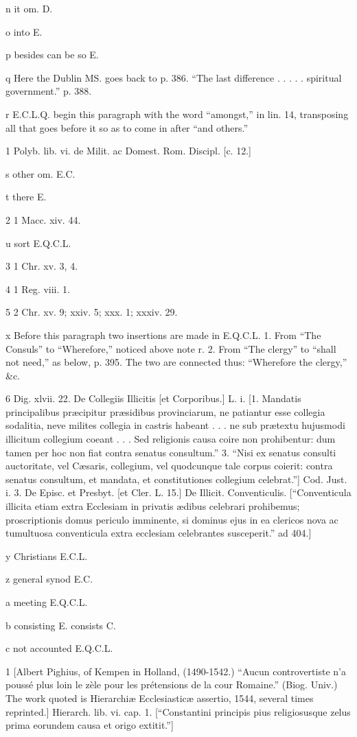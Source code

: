n
it om. D.

o
into E.

p
besides can be so E.

q
Here the Dublin MS. goes back to p. 386. “The last difference . . . . . spiritual government.” p. 388.

r
E.C.L.Q. begin this paragraph with the word “amongst,” in lin. 14, transposing all that goes before it so as to come in after “and others.”

1
Polyb. lib. vi. de Milit. ac Domest. Rom. Discipl. [c. 12.]

s
other om. E.C.

t
there E.

2
1 Macc. xiv. 44.

u
sort E.Q.C.L.

3
1 Chr. xv. 3, 4.

4
1 Reg. viii. 1.

5
2 Chr. xv. 9; xxiv. 5; xxx. 1; xxxiv. 29.

x
Before this paragraph two insertions are made in E.Q.C.L. 1. From “The Consuls” to “Wherefore,” noticed above note r. 2. From “The clergy” to “shall not need,” as below, p. 395. The two are connected thus: “Wherefore the clergy,” &c.

6
Dig. xlvii. 22. De Collegiis Illicitis [et Corporibus.] L. i. [1. Mandatis principalibus præcipitur præsidibus provinciarum, ne patiantur esse collegia sodalitia, neve milites collegia in castris habeant . . . ne sub prætextu hujusmodi illicitum collegium coeant . . . Sed religionis causa coire non prohibentur: dum tamen per hoc non fiat contra senatus consultum.” 3. “Nisi ex senatus consulti auctoritate, vel Cæsaris, collegium, vel quodcunque tale corpus coierit: contra senatus consultum, et mandata, et constitutiones collegium celebrat.”] Cod. Just. i. 3. De Episc. et Presbyt. [et Cler. L. 15.] De Illicit. Conventiculis. [“Conventicula illicita etiam extra Ecclesiam in privatis ædibus celebrari prohibemus; proscriptionis domus periculo imminente, si dominus ejus in ea clericos nova ac tumultuosa conventicula extra ecclesiam celebrantes susceperit.” ad 404.]

y
Christians E.C.L.

z
general synod E.C.

a
meeting E.Q.C.L.

b
consisting E. consists C.

c
not accounted E.Q.C.L.

1
[Albert Pighius, of Kempen in Holland, (1490-1542.) “Aucun controvertiste n’a poussé plus loin le zèle pour les prétensions de la cour Romaine.” (Biog. Univ.) The work quoted is Hierarchiæ Ecclesiasticæ assertio, 1544, several times reprinted.] Hierarch. lib. vi. cap. 1. [“Constantini principis pius religiosusque zelus prima eorundem causa et origo extitit.”]

